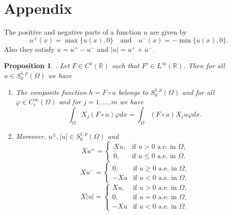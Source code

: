 \documentclass[a4paper,12pt,reqno]{amsart}
\numberwithin{equation}{section}
\theoremstyle{plain}
\newtheorem{prop}[thm]{Proposition}
\theoremstyle{definition}
\begin{document}
\section{Appendix}
The positive and negative parts of a function $u$ are given by
$$u^{+}(x)=\max \{u(x), 0\}\quad\text{and}\quad u^{-}(x)=-\min \{u(x), 0\}.$$ Also they satisfy $u=u^{+}-u^{-}$ and $|u|=u^{+}+u^{-}$.
\begin{prop}\label{proposition Xu} \cite[Lemma 3.5]{GN1996}. 
Let $F\in C^{1}({\mathbb{R}})$ such that $F'\in L^{\infty}({\mathbb{R}})$. Then for all $u \in S_{0}^{1,p}(\Omega)$  we have 
\begin{enumerate}[label=(\roman*)]
    \item The composite function $h=F\circ u$ belongs to $S_{0}^{1,p}(\Omega)$ and for all $\varphi\in C^{\infty}_{c}(\Omega)$ and for $j=1,...,m$ we have
    \begin{equation*}
       \int_{\Omega} X_{j}(F\circ u)\varphi dx=\int_{\Omega}(F\circ u)X_{j}u\varphi dx.
    \end{equation*}
    \item Moreover, $u^{\pm}, |u| \in S_{0}^{1,p}(\Omega)$ and 
\begin{equation*}
Xu^{+}=\begin{cases}
Xu, & \text{if $u>0$ a.e. in $\Omega$,}\\
0, & \text{if $u\leq 0$ a.e.  in $\Omega$.}
\end{cases}
\end{equation*}
\begin{equation*}
Xu^{-}=\begin{cases}
0, & \text{if $u\geq0$ a.e.  in $\Omega$,}\\
-Xu & \text{if $u<0$ a.e.  in $\Omega$.}
\end{cases}
\end{equation*}
\begin{equation*}
X|u|=\begin{cases}
Xu, & \text{if $u>0$ a.e.  in $\Omega$,}\\
0, & \text{if $u= 0$ a.e.  in $\Omega$,}\\
-Xu & \text{if $u<0$ a.e.  in $\Omega$.}
\end{cases}
\end{equation*}
\end{enumerate}
\end{prop}
\end{document}
